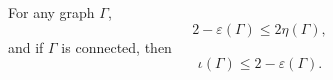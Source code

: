 For any graph $\Gamma$,
$$2 - \varepsilon(\Gamma) \leq 2\eta(\Gamma),$$
and if $\Gamma$ is connected, then
$$\iota(\Gamma) \leq 2 - \varepsilon(\Gamma).$$
